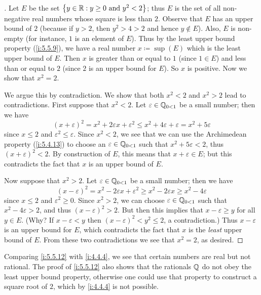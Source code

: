 \begin{proof}[]
  Let \(E\) be the set \(\left\lbrace y \in \mathbb{R} : y \geq 0 \text{ and } y^2 < 2\right\rbrace\);
  thus \(E\) is the set of all non-negative real numbers whose square is less than \(2\).
  Observe that \(E\) has an upper bound of \(2\) (because if \(y > 2\), then \(y^2 > 4 > 2\) and hence \(y \notin E\)).
  Also, \(E\) is non-empty (for instance, \(1\) is an element of \(E\)).
  Thus by the least upper bound property (\cref{i:5.5.9}), we have a real number \(x \coloneqq \sup(E)\) which is the least upper bound of \(E\).
  Then \(x\) is greater than or equal to \(1\) (since \(1 \in E\)) and less than or equal to \(2\)
  (since \(2\) is an upper bound for \(E\)).
  So \(x\) is positive.
  Now we show that \(x^2 = 2\).

  We argue this by contradiction.
  We show that both \(x^2 < 2\) and \(x^2 > 2\) lead to contradictions.
  First suppose that \(x^2 < 2\).
  Let \(\varepsilon \in \mathbb{Q}_{0 < 1}\) be a small number;
  then we have
  \[
    (x + \varepsilon)^2 = x^2 + 2\varepsilon x + \varepsilon^2 \leq x^2 + 4\varepsilon + \varepsilon = x^2 + 5\varepsilon
  \]
  since \(x \leq 2\) and \(\varepsilon^2 \leq \varepsilon\).
  Since \(x^2 < 2\), we see that we can use the Archimedean property (\cref{i:5.4.13}) to choose an \(\varepsilon \in \mathbb{Q}_{0 < 1}\) such that \(x^2 + 5\varepsilon < 2\), thus \((x + \varepsilon)^2 < 2\).
  By construction of \(E\), this means that \(x + \varepsilon \in E\);
  but this contradicts the fact that \(x\) is an upper bound of \(E\).

  Now suppose that \(x^2 > 2\).
  Let \(\varepsilon \in \mathbb{Q}_{0 < 1}\) be a small number;
  then we have
  \[
    (x - \varepsilon)^2 = x^2 - 2\varepsilon x + \varepsilon^2 \geq x^2 - 2\varepsilon x \geq x^2 - 4\varepsilon
  \]
  since \(x \leq 2\) and \(\varepsilon^2 \geq 0\).
  Since \(x^2 > 2\), we can choose \(\varepsilon \in \mathbb{Q}_{0 < 1}\) such that \(x^2 - 4\varepsilon > 2\), and thus \((x - \varepsilon)^2 > 2\).
  But then this implies that \(x - \varepsilon \geq y\) for all \(y \in E\).
  (Why? If \(x - \varepsilon < y\) then \((x - \varepsilon)^2 < y^2 \leq 2\), a contradiction.)
  Thus \(x - \varepsilon\) is an upper bound for \(E\), which contradicts the fact that \(x\) is the \emph{least} upper bound of \(E\).
  From these two contradictions we see that \(x^2 = 2\), as desired.
\end{proof}

\begin{rmk}\label{i:5.5.13}
  Comparing \cref{i:5.5.12} with \cref{i:4.4.4}, we see that certain numbers are real but not rational.
  The proof of \cref{i:5.5.12} also shows that the rationals \(\mathbb{Q}\) do not obey the least upper bound property, otherwise one could use that property to construct a square root of \(2\), which by \cref{i:4.4.4} is not possible.
\end{rmk}

